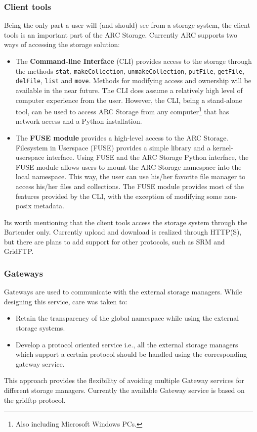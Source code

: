 \documentclass[final]{ieee}
\begin{document}
\subsubsection{Client tools }
\label{Client extension using FUSE module}

Being the only part a user will (and should) see from a storage
system, the client tools is an important part of the ARC
Storage. Currently ARC supports two ways of accessing the
storage solution:
\begin{itemize}
\item The \textbf{Command-line Interface} (CLI) provides
  access to the storage through the methods \texttt{stat}, \texttt{makeCollection},
  \texttt{unmakeCollection}, \texttt{putFile}, \texttt{getFile}, \texttt{delFile},
  \texttt{list} and \texttt{move}. Methods for modifying
  access and ownership will be available in the near future. The CLI
  does assume a relatively high level of computer experience
  from the user. However, the CLI, being a stand-alone tool, can be
  used to access ARC Storage from any computer\footnote{Also including
  Microsoft Windows PCs.} that has network access and
  a Python installation.
\item The \textbf{FUSE module} provides a high-level access to the
  ARC Storage. Filesystem in Userspace (FUSE) provides a simple
  library and a kernel-userspace interface. Using FUSE and the ARC
  Storage Python interface, the FUSE module allows users to mount the
  ARC Storage namespace into the local namespace. This way, the user
  can use his/her favorite file manager to access his/her files and
  collections. The FUSE module provides most of the features provided
  by the CLI, with the exception of modifying some non-posix metadata.
\end{itemize}
Its worth mentioning that the client tools access the storage system
through the Bartender only. Currently upload and download is realized
through HTTP(S), but there are plans to add support for other
protocols, such as SRM and GridFTP.

\subsubsection{Gateways }
\label{Gateways}

Gateways are used to communicate with the external storage
managers. While designing this service, care was taken to: 
\begin{itemize}
\item Retain the transparency of the global namespace while using the external storage systems.
\item  Develop a protocol oriented  service i.e., all the external
  storage managers which support a certain protocol should be handled
  using the corresponding gateway service.  
\end{itemize}
This approach provides the flexibility of  avoiding multiple Gateway
services for different storage managers. Currently the available
Gateway service is based on the gridftp protocol.  
\end{document}
